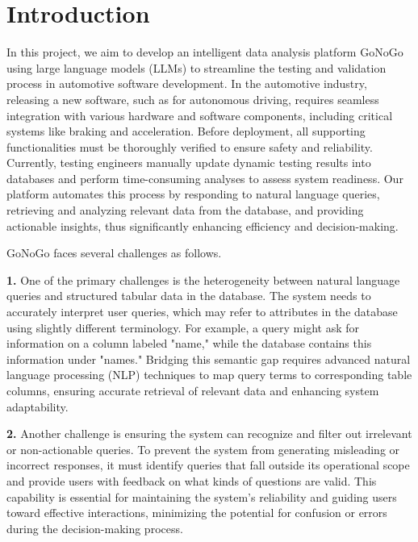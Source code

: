 \section{Introduction}
In this project, we aim to develop an intelligent data analysis platform GoNoGo using large language models (LLMs) to streamline the testing and validation process in automotive software development. In the automotive industry, releasing a new software, such as for autonomous driving, requires seamless integration with various hardware and software components, including critical systems like braking and acceleration. Before deployment, all supporting functionalities must be thoroughly verified to ensure safety and reliability. Currently, testing engineers manually update dynamic testing results into databases and perform time-consuming analyses to assess system readiness. Our platform automates this process by responding to natural language queries, retrieving and analyzing relevant data from the database, and providing actionable insights, thus significantly enhancing efficiency and decision-making.

GoNoGo faces several challenges as follows.


\textbf{1.} One of the primary challenges is the heterogeneity between natural language queries and structured tabular data in the database. The system needs to accurately interpret user queries, which may refer to attributes in the database using slightly different terminology. For example, a query might ask for information on a column labeled "name," while the database contains this information under "names." Bridging this semantic gap requires advanced natural language processing (NLP) techniques to map query terms to corresponding table columns, ensuring accurate retrieval of relevant data and enhancing system adaptability.

\textbf{2.} Another challenge is ensuring the system can recognize and filter out irrelevant or non-actionable queries. To prevent the system from generating misleading or incorrect responses, it must identify queries that fall outside its operational scope and provide users with feedback on what kinds of questions are valid. This capability is essential for maintaining the system's reliability and guiding users toward effective interactions, minimizing the potential for confusion or errors during the decision-making process.

